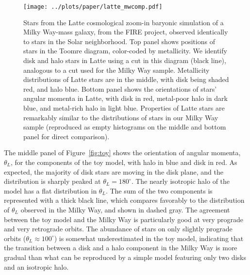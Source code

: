 \documentclass[apj, twocolappendix, numberedappendix, appendixfloats]{emulateapj}
\begin{document}
\begin{figure}
\begin{center}
\texttt{[image: ../plots/paper/latte\_mwcomp.pdf]}
\caption{Stars from the Latte cosmological zoom-in baryonic simulation of a Milky Way-mass galaxy, from the FIRE project, observed identically to stars in the Solar neighborhood.
Top panel shows positions of stars in the Toomre diagram, color-coded by metallicity.
We identify disk and halo stars in Latte using a cut in this diagram (black line), analogous to a cut used for the Milky Way sample.
Metallicity distributions of Latte stars are in the middle, with disk being shaded red, and halo blue.
Bottom panel shows the orientations of stars' angular momenta in Latte, with disk in red, metal-poor halo in dark blue, and metal-rich halo in light blue.
Properties of Latte stars are remarkably similar to the distributions of stars in our Milky Way sample (reproduced as empty histograms on the middle and bottom panel for direct comparison).
}
\label{fig:latte}
\end{center}
\end{figure}

The middle panel of Figure~\ref{fig:toy} shows the orientation of angular momenta, $\theta_L$, for the components of the toy model, with halo in blue and disk in red.
As expected, the majority of disk stars are moving in the disk plane, and the distribution is sharply peaked at $\theta_L=180^\circ$.
The nearly isotropic halo of the \citet{bensby2003} model has a flat distribution in $\theta_L$.
The sum of the two components is represented with a thick black line, which compares favorably to the distribution of $\theta_L$ observed in the Milky Way, and shown in dashed gray.
The agreement between the toy model and the Milky Way is particularly good at very prograde and very retrograde orbits.
The abundance of stars on only slightly prograde orbits ($\theta_L\approx100^\circ$) is somewhat underestimated in the toy model, indicating that the transition between a disk and a halo component in the Milky Way is more gradual than what can be reproduced by a simple model featuring only two disks and an isotropic halo. %
\end{document}
